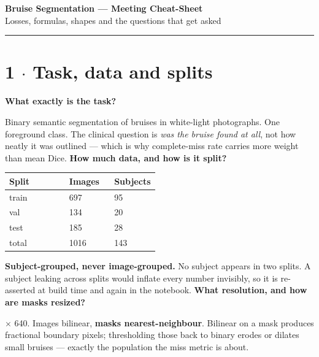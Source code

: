 \documentclass[10pt,a4paper]{article}
\newcommand{\qq}[1]{\medskip\noindent\textbf{\color{navy}#1}\par\nobreak}
\begin{document}
\begin{center}{\LARGE\bfseries\color{navy} Bruise Segmentation --- Meeting Cheat-Sheet}\\[2pt]
{\small Losses, formulas, shapes and the questions that get asked}\end{center}
\vspace{2mm}\hrule\vspace{3mm}
\section*{1 $\cdot$ Task, data and splits}
\qq{What exactly is the task?}
Binary semantic segmentation of bruises in white-light photographs. One foreground class. The clinical question is \textit{was the bruise found at all}, not how neatly it was outlined — which is why complete-miss rate carries more weight than mean Dice.
\qq{How much data, and how is it split?}
\begin{center}\small\begin{tabular}{p{0.4\linewidth}p{0.3\linewidth}p{0.3\linewidth}}
\toprule
\textbf{Split} & \textbf{Images} & \textbf{Subjects} \\
\midrule
train & 697 & 95 \\
val & 134 & 20 \\
test & 185 & 28 \\
total & 1016 & 143 \\
\bottomrule\end{tabular}\end{center}
\textbf{Subject-grouped, never image-grouped.} No subject appears in two splits. A subject leaking across splits would inflate every number invisibly, so it is re-asserted at build time and again in the notebook.
\qq{What resolution, and how are masks resized?}
640 $\times$ 640. Images bilinear, \textbf{masks nearest-neighbour}. Bilinear on a mask produces fractional boundary pixels; thresholding those back to binary erodes or dilates small bruises — exactly the population the miss metric is about.
\end{document}
